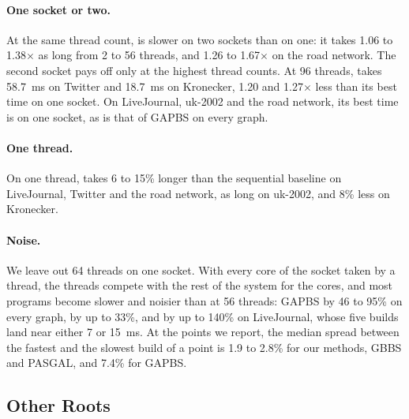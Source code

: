 \paragraph{One socket or two.} At the same thread count, \wfdo is slower on two sockets than on one: it takes 1.06 to 1.38$\times$ as long from 2 to 56 threads, and 1.26 to 1.67$\times$ on the road network. The second socket pays off only at the highest thread counts. At 96 threads, \wfdo takes 58.7~ms on Twitter and 18.7~ms on Kronecker, 1.20 and 1.27$\times$ less than its best time on one socket. On LiveJournal, uk-2002 and the road network, its best time is on one socket, as is that of GAPBS on every graph.

\paragraph{One thread.} On one thread, \wfdo takes 6 to 15\% longer than the sequential baseline on LiveJournal, Twitter and the road network, as long on uk-2002, and 8\% less on Kronecker.

\paragraph{Noise.} We leave out 64 threads on one socket. With every core of the socket taken by a thread, the threads compete with the rest of the system for the cores, and most programs become slower and noisier than at 56 threads: GAPBS by 46 to 95\% on every graph, \wfdo by up to 33\%, and \wfdomem by up to 140\% on LiveJournal, whose five builds land near either 7 or 15~ms. At the points we report, the median spread between the fastest and the slowest build of a point is 1.9 to 2.8\% for our methods, GBBS and PASGAL, and 7.4\% for GAPBS.

\subsection{Other Roots}
\label{sec:exp-roots}

